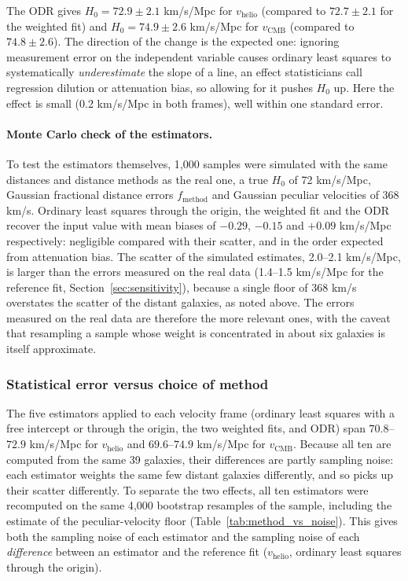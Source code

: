 \documentclass[11pt]{article}
\begin{document}
The ODR gives $H_0 = 72.9 \pm 2.1$ km/s/Mpc for $v_{\text{helio}}$ (compared to $72.7 \pm 2.1$ for the weighted fit) and $H_0 = 74.9 \pm 2.6$ km/s/Mpc for $v_{\text{CMB}}$ (compared to $74.8 \pm 2.6$). The direction of the change is the expected one: ignoring measurement error on the independent variable causes ordinary least squares to systematically \emph{underestimate} the slope of a line, an effect statisticians call regression dilution or attenuation bias, so allowing for it pushes $H_0$ up. Here the effect is small (0.2 km/s/Mpc in both frames), well within one standard error.

\paragraph{Monte Carlo check of the estimators.} To test the estimators themselves, 1{,}000 samples were simulated with the same distances and distance methods as the real one, a true $H_0$ of 72 km/s/Mpc, Gaussian fractional distance errors $f_{\text{method}}$ and Gaussian peculiar velocities of 368 km/s. Ordinary least squares through the origin, the weighted fit and the ODR recover the input value with mean biases of $-0.29$, $-0.15$ and $+0.09$ km/s/Mpc respectively: negligible compared with their scatter, and in the order expected from attenuation bias. The scatter of the simulated estimates, 2.0--2.1 km/s/Mpc, is larger than the errors measured on the real data (1.4--1.5 km/s/Mpc for the reference fit, Section~\ref{sec:sensitivity}), because a single floor of 368 km/s overstates the scatter of the distant galaxies, as noted above. The errors measured on the real data are therefore the more relevant ones, with the caveat that resampling a sample whose weight is concentrated in about six galaxies is itself approximate.

\subsubsection{Statistical error versus choice of method}
\label{sec:method_vs_noise}
The five estimators applied to each velocity frame (ordinary least squares with a free intercept or through the origin, the two weighted fits, and ODR) span $70.8$--$72.9$ km/s/Mpc for $v_{\text{helio}}$ and $69.6$--$74.9$ km/s/Mpc for $v_{\text{CMB}}$. Because all ten are computed from the same 39 galaxies, their differences are partly sampling noise: each estimator weights the same few distant galaxies differently, and so picks up their scatter differently. To separate the two effects, all ten estimators were recomputed on the same 4{,}000 bootstrap resamples of the sample, including the estimate of the peculiar-velocity floor (Table~\ref{tab:method_vs_noise}). This gives both the sampling noise of each estimator and the sampling noise of each \emph{difference} between an estimator and the reference fit ($v_{\text{helio}}$, ordinary least squares through the origin).
\end{document}

